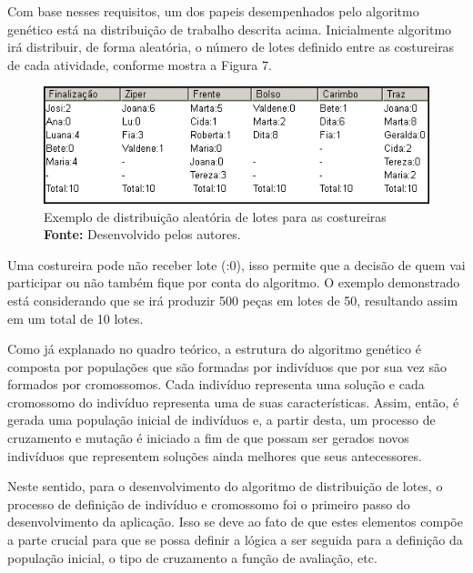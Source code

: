 \par Com base nesses requisitos, um dos papeis desempenhados pelo algoritmo genético está na distribuição de
trabalho descrita acima. Inicialmente algoritmo irá distribuir, de forma
aleatória, o número de lotes definido entre as costureiras de cada atividade,
conforme mostra a Figura 7.

\begin{figure}[h!]
	\centerline{\includegraphics[scale=1.0]{./imagens/distribuicao_exemplo.png}}
	\caption[Exemplo de distribuição aleatória de lotes para as costureiras]
	{Exemplo de distribuição aleatória de lotes para as costureiras \textbf{Fonte:}
	Desenvolvido pelos autores.}
	\label{fig:exemplo1}
\end{figure}

\par Uma costureira pode não receber lote (:0), isso permite que a decisão de
quem vai participar ou não também fique por conta do algoritmo. O exemplo demonstrado está considerando que se irá produzir 500 peças em lotes de 50, 
resultando assim em um total de 10 lotes.

\par Como já explanado no quadro teórico, a estrutura do algoritmo genético é composta
por populações que são formadas por indivíduos que por sua vez são formados por cromossomos.
Cada indivíduo representa uma solução e cada cromossomo do indivíduo representa uma de suas características. 
Assim, então, é gerada uma população inicial de indivíduos e, a partir desta, um
processo de cruzamento e mutação é iniciado a fim de que possam ser gerados
novos indivíduos que representem soluções ainda melhores que seus antecessores.

\par Neste sentido, para o desenvolvimento do algoritmo de distribuição de
lotes, o processo de definição de indivíduo e cromossomo foi o primeiro passo do desenvolvimento da aplicação. Isso se
deve ao fato de que estes elementos compõe a parte crucial para que se
possa definir a lógica a ser seguida para a definição da população inicial, o
tipo de cruzamento a função de avaliação, etc.

